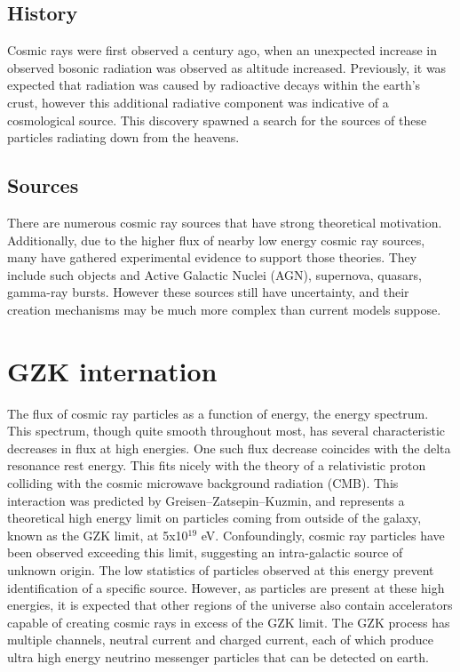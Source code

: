 	\subsection{History}
		Cosmic rays were first observed a century ago, when an unexpected increase in observed bosonic radiation was observed as altitude increased.  Previously, it was expected that radiation was caused by radioactive decays within the earth's crust, however this additional radiative component was indicative of a cosmological source.  This discovery spawned a search for the sources of these particles radiating down from the heavens.
	\subsection{Sources}
		There are numerous cosmic ray sources that have strong theoretical motivation.  Additionally, due to the higher flux of nearby low energy cosmic ray sources, many have gathered experimental evidence to support those theories.  They include such objects and Active Galactic Nuclei (AGN), supernova, quasars, gamma-ray bursts.  However these sources still have uncertainty, and their creation mechanisms may be much more complex than current models suppose.


\section{GZK internation}
		The flux of cosmic ray particles as a function of energy, the energy spectrum.  This spectrum, though quite smooth throughout most, has several characteristic decreases in flux at high energies.  One such flux decrease coincides with the delta resonance rest energy.  This fits nicely with the theory of a relativistic proton colliding with the cosmic microwave background radiation (CMB).  This interaction was predicted by Greisen–Zatsepin–Kuzmin, and represents a theoretical high energy limit on particles coming from outside of the galaxy, known as the GZK limit, at 5x10$^{19}$ eV.  Confoundingly, cosmic ray particles have been observed exceeding this limit, suggesting an intra-galactic source of unknown origin.  The low statistics of particles observed at this energy prevent identification of a specific source.  However, as particles are present at these high energies, it is expected that other regions of the universe also contain accelerators capable of creating cosmic rays in excess of the GZK limit.  The GZK process has multiple channels, neutral current and charged current, each of which produce ultra high energy neutrino messenger particles that can be detected on earth.

